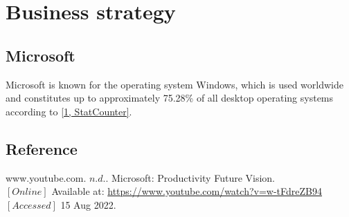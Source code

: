 \section{Business strategy}
\subsection{Microsoft}
Microsoft is known for the operating system Windows, which is used worldwide and constitutes up to approximately 75.28\% of all desktop operating systems according to \href{https://gs.statcounter.com/os-market-share/desktop/worldwide/#monthly-202204-202204-bar}{[1, StatCounter]}.

\subsection{Reference}
www.youtube.com. \(n.d.\). Microsoft: Productivity Future Vision. \\
$[Online]$ Available at: \href{https://www.youtube.com/watch?v=w-tFdreZB94}{https://www.youtube.com/watch?v=w-tFdreZB94} \\
$[Accessed]$ 15 Aug 2022. \\

‌
